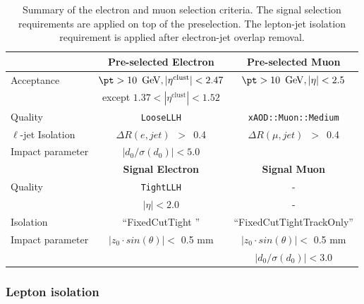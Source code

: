 \begin{table}[htb!]
\caption{Summary of the electron and muon selection criteria. The signal
  selection requirements are applied on top of the preselection. The
  lepton-jet isolation requirement is applied after electron-jet overlap
  removal.}
\label{tab:lepdef}
\begin{center}
    \begin{tabular}{|l|c|c|}
      \hline
      \hline
       & \textbf{Pre-selected Electron} & \textbf{Pre-selected Muon} \\
      \hline
      \hline
      Acceptance     & $\pt > 10\,\GeV, |\eta^\mathrm{clust}| < 2.47$  & $\pt > 10\,\GeV, |\eta| < 2.5$ \\
                     &  except $1.37<|\eta^\mathrm{clust}|<1.52$       & \\
      \hline
      Quality & {\tt LooseLLH} & {\tt{xAOD::Muon::Medium}} \\
      \hline
      $\ell$-jet Isolation      & $\Delta{}R(e,jet)$~$>$~0.4 & $\Delta{}R(\mu,jet)$~$>$~0.4 \\
      \hline
      Impact parameter & $|d_0/\sigma(d_0)|<5.0$  & \\
      \hline\hline
       & \textbf{Signal Electron} & \textbf{Signal Muon} \\
      \hline
      \hline
      Quality & {\tt TightLLH} & -\\
       & $|\eta|<2.0$  & -\\
            \hline
      Isolation                & ``FixedCutTight '' & ``FixedCutTightTrackOnly'' \\
      \hline
      Impact parameter & $|z_0 \cdot sin(\theta)|<$ 0.5 mm   & $|z_0 \cdot sin(\theta)|<$ 0.5 mm \\ 
                       &                                     & $|d_0/\sigma(d_0)| < 3.0$\\
     \hline
\end{tabular}
\end{center}
\end{table}


\subsubsection{Lepton isolation}
\label{sec:isolation}

